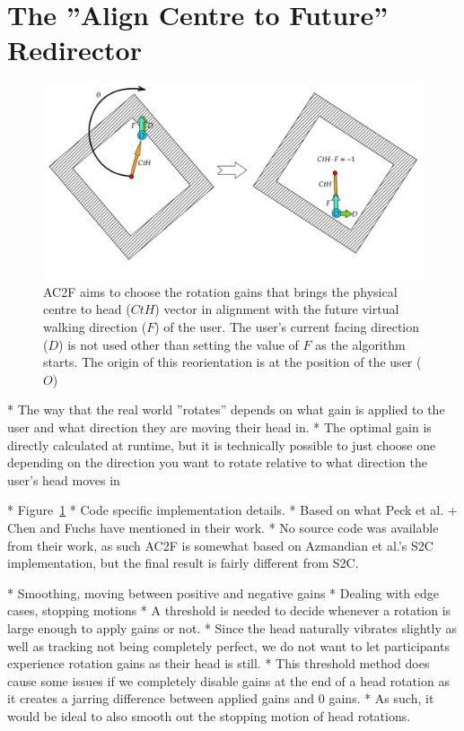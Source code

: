 \section{The ''Align Centre to Future'' Redirector}
\begin{figure}[htbp]
  \centering
  \includegraphics[width=\textwidth]{figures/graphs/AC2F.png}
  \caption[Align Centre to Future Algorithm Example]{AC2F aims to choose the rotation gains that brings the physical centre to head ($CtH$) vector in alignment with the future virtual walking direction ($F$) of the user. The user's current facing direction ($D$) is not used other than setting the value of $F$ as the algorithm starts. The origin of this reorientation is at the position of the user ($O$)}
  \label{fig:ac2f}
\end{figure}

* The way that the real world ''rotates'' depends on what gain is applied to the user and what direction they are moving their head in. 
   * The optimal gain is directly calculated at runtime, but it is technically possible to just choose one depending on the direction you want to rotate relative to what direction the user's head moves in


* Figure~\ref{fig:ac2f}
* Code specific implementation details. 
* Based on what Peck et al. + Chen and Fuchs have mentioned in their work. 
   * No source code was available from their work, as such AC2F is somewhat based on Azmandian et al.'s S2C implementation, but the final result is fairly different from S2C.
   
   
* Smoothing, moving between positive and negative gains
   * Dealing with edge cases, stopping motions
   * A threshold is needed to decide whenever a rotation is large enough to apply gains or not.
      * Since the head naturally vibrates slightly as well as tracking not being completely perfect, we do not want to let participants experience rotation gains as their head is still.
      * This threshold method does cause some issues if we completely disable gains at the end of a head rotation as it creates a jarring difference between applied gains and 0 gains.
      * As such, it would be ideal to also smooth out the stopping motion of head rotations.


